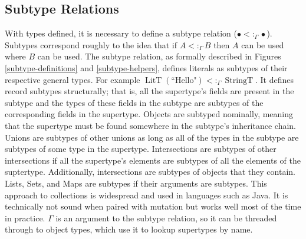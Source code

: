 \documentclass{article}
\DeclareMathOperator{\StringT}{StringT}
\DeclareMathOperator{\LitT}{LitT}
\newcommand{\subtype}{<:_\Gamma}
\begin{document}
\subsection{Subtype Relations}

With types defined, it is necessary to define a subtype 
relation (\(\bullet\subtype\bullet\)). Subtypes correspond 
roughly to the idea that if \(A\subtype B\) then \(A\)
can be used where \(B\) can be used. The subtype relation,
as formally described in Figures \ref{subtype-definitions} and \ref{subtype-helpers}, 
defines literals as subtypes of their respective general types.
For example \(\LitT(\text{``Hello"})\subtype\StringT\). It defines
record subtypes structurally; that is, all the supertype's fields 
are present in the subtype and the types of these fields in the subtype
are subtypes of the corresponding fields in the supertype. 
Objects are subtyped nominally, meaning that the supertype must be
found somewhere in the subtype's inheritance chain. Unions are
subtypes of other unions as long as all of the types in the 
subtype are subtypes of some type in the supertype. Intersections are 
subtypes of other intersections if all the supertype's elements are 
subtypes of all the elements of the suptertype. Additionally, 
intersections are subtypes of objects that they contain. Lists, 
Sets, and Maps are subtypes if their arguments are subtypes. This
approach to collections is widespread and used in languages such
as Java. It is technically not sound when paired with mutation 
but works well most of the time in practice. \(\Gamma\) is an 
argument to the subtype relation, so it can be threaded through 
to object types, which use it to lookup supertypes by name. 
\end{document}

